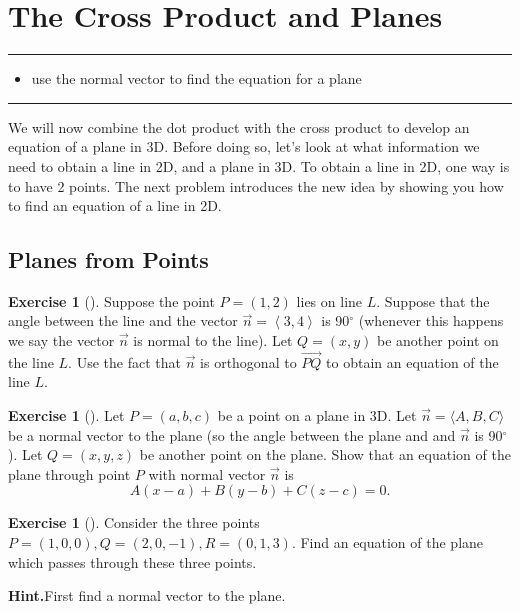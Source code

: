 \documentclass[10pt,]{book}
\theoremstyle{plain}
\theoremstyle{definition}
\theoremstyle{definition}
\theoremstyle{definition}
\theoremstyle{definition}
\newtheorem{exploration}[project]{Exercise}
\newenvironment{objectives}[1]{\noindent\rule{\linewidth}{0.1ex}\newline{\textbf{{\large#1}}\par\smallskip}}{\par\noindent\rule{\linewidth}{0.1ex}\par\smallskip}
\theoremstyle{definition}
\numberwithin{equation}{section}
\newcommand{\lt}{<}
\begin{document}
\section[{The Cross Product and Planes}]{The Cross Product and Planes}\label{ch02_5_crossplanes}
\begin{objectives}{Objectives: Topical}\label{objectives-6}
%
\begin{itemize}[label=\textbullet]
\item{}use the normal vector to find the equation for a plane%
\end{itemize}
\end{objectives}
We will now combine the dot product with the cross product to develop an equation of a plane in 3D. Before doing so, let's look at what information we need to obtain a line in 2D, and a plane in 3D. To obtain a line in 2D, one way is to have 2 points. The next problem introduces the new idea by showing you how to find an equation of a line in 2D.%
\typeout{************************************************}
\typeout{************************************************}
\subsection[{Planes from Points}]{Planes from Points}\label{subsection-12}
\begin{exploration}[]\label{prob_plane_equation_normal_point}
Suppose the point \(P=(1,2)\) lies on line \(L\). Suppose that the angle between the line and the vector \(\vec n=\left\lt 3,4\right>\) is 90\(^\circ\) (whenever this happens we say the vector \(\vec n\) is normal to the line). Let \(Q=(x,y)\) be another point on the line \(L\). Use the fact that \(\vec n\) is orthogonal to \(\vec {PQ}\) to obtain an equation of the line \(L\).%
\end{exploration}
\begin{exploration}[]\label{plane_equation_three_points}
Let \(P=(a,b,c)\) be a point on a plane in 3D. Let \(\vec n=\langle A,B,C \rangle\) be a normal vector to the plane (so the angle between the plane and and \(\vec n\) is 90\(^\circ\)). Let \(Q=(x,y,z)\) be another point on the plane. Show that an equation of the plane through point \(P\) with normal vector \(\vec n\) is%
\begin{equation*}
A(x-a)+B(y-b)+C(z-c)=0.
\end{equation*}
%
\end{exploration}
\begin{exploration}[]\label{exploration-46}
Consider the three points \(P=(1,0,0), Q=(2,0,-1), R=(0,1,3)\). Find an equation of the plane which passes through these three points.%
\par\medskip\noindent%
\textbf{Hint.}\quad First find a normal vector to the plane.%
\end{exploration}
\typeout{************************************************}
\typeout{************************************************}
\end{document}
